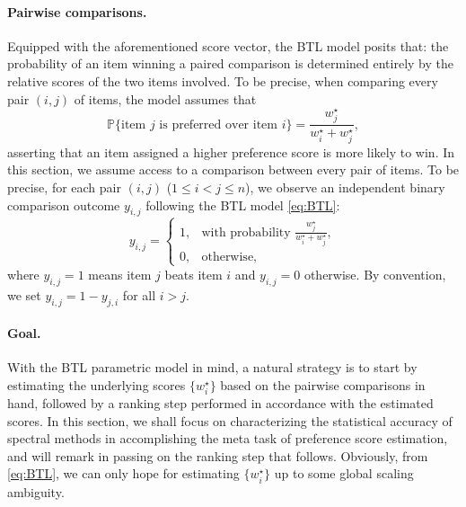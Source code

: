 


\paragraph{Pairwise comparisons.}
Equipped with the aforementioned score
vector, the BTL model posits that: the probability of an item winning a paired comparison is determined entirely by the
relative scores of the two items involved. To be precise, when comparing  every pair $(i,j)$ of items, the model assumes that
%
\begin{equation}
	\mathbb{P} \big\{ \text{item }j\text{ is preferred over item }i \big\}
	= \frac{w_{j}^{\star}}{w_{i}^{\star}+ w_{j}^{\star}},
	\label{eq:BTL}
\end{equation}
%
asserting that an item assigned a higher preference score is more likely to win.
In this section, we assume access to a comparison between every pair of items. To be precise, for each pair
$(i,j)$ ($1\le i<j\le n$), we observe an independent binary comparison outcome $y_{i,j}$ following the BTL model \eqref{eq:BTL}:
%
\[
y_{i,j}=\begin{cases}
1, & \text{with probability }\frac{w_{j}^{\star}}{w_{i}^{\star}+w_{j}^{\star}},\\
0, & \text{otherwise},
\end{cases}
\]
%
where $y_{i,j}=1$ means item $j$ beats item $i$ and $y_{i,j}=0$ otherwise.
By convention, we set $y_{i,j}=1-y_{j,i}$ for all $i>j$.
%
%

%

\paragraph{Goal. }
With the BTL parametric model in mind,
a natural strategy is to start by estimating the underlying scores $\{ w_i^{\star}\}$ based on the pairwise comparisons in hand, followed by a ranking step performed in  accordance with the estimated scores.
In this section, we shall focus on characterizing the statistical accuracy of spectral methods in accomplishing the meta task of preference score estimation,
and will remark in passing on the ranking step that follows. Obviously, from \eqref{eq:BTL}, we can only hope for estimating $\{ w_i^{\star}\}$ up to some global scaling ambiguity.


